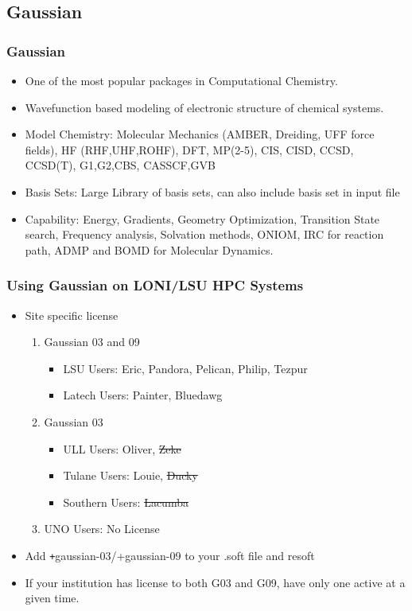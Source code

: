 \documentclass[slidestop,mathserif,compress,xcolor=svgnames]{beamer}
\begin{document}
\subsection{Gaussian}
\begin{frame}
  \frametitle{\small Gaussian}
  \begin{block}{}
    \begin{itemize}
      \item One of the most popular packages in Computational Chemistry.
      \item Wavefunction based modeling of electronic structure of chemical systems.
      \item Model Chemistry: Molecular Mechanics (AMBER, Dreiding, UFF force fields), HF (RHF,UHF,ROHF), DFT, MP(2-5), CIS, CISD, CCSD, CCSD(T), G1,G2,CBS, CASSCF,GVB
      \item Basis Sets: Large Library of basis sets, can also include basis set in input file
      \item Capability: Energy, Gradients, Geometry Optimization, Transition State search, Frequency analysis, Solvation methods, ONIOM, IRC for reaction path, ADMP and BOMD for Molecular Dynamics.
    \end{itemize}
  \end{block}
\end{frame}

\begin{frame}
  \frametitle{\small Using Gaussian on LONI/LSU HPC Systems}
  \begin{exampleblock}{}
    \begin{itemize}
      \item Site specific license
      \begin{enumerate}
	\item {\color{tigersblue}Gaussian 03 and 09}
	\begin{itemize}
	  \item {\color{tigersblue}LSU Users}: Eric, {\color{green!30!black}Pandora, Pelican, Philip, Tezpur}
	  \item {\color{tigersblue}Latech Users}: Painter, Bluedawg
	\end{itemize}
	\item {\color{tigerspurple}Gaussian 03}
	\begin{itemize}
	  \item {\color{tigerspurple}ULL Users}: Oliver, \sout{Zeke}
	  \item {\color{tigerspurple}Tulane Users}: Louie, \sout{Ducky}
	  \item {\color{tigerspurple}Southern Users}: \sout{Lacumba}
	\end{itemize}
	\item UNO Users: No License
      \end{enumerate}
      \item Add {\texttt +gaussian-03/+gaussian-09} to your .soft file and resoft
      \item \alert{If your institution has license to both G03 and G09, have only one active at a given time.}
    \end{itemize}
  \end{exampleblock}
\end{frame}
\end{document}

